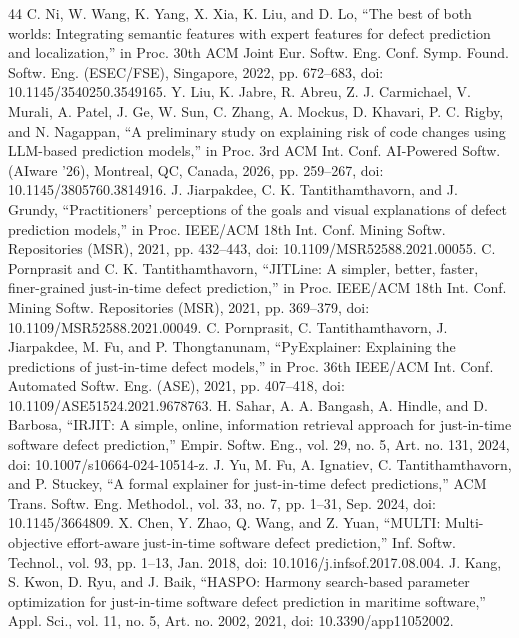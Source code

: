 \begin{thebibliography}{44}
 C. Ni, W. Wang, K. Yang, X. Xia, K. Liu, and D. Lo, ``The best of both worlds: Integrating semantic features with expert features for defect prediction and localization,'' in Proc. 30th ACM Joint Eur. Softw. Eng. Conf. Symp. Found. Softw. Eng. (ESEC/FSE), Singapore, 2022, pp. 672--683, doi: \mbox{10.1145/3540250.3549165}.
 Y. Liu, K. Jabre, R. Abreu, Z. J. Carmichael, V. Murali, A. Patel, J. Ge, W. Sun, C. Zhang, A. Mockus, D. Khavari, P. C. Rigby, and N. Nagappan, ``A preliminary study on explaining risk of code changes using LLM-based prediction models,'' in Proc. 3rd ACM Int. Conf. AI-Powered Softw. (AIware '26), Montreal, QC, Canada, 2026, pp. 259--267, doi: \mbox{10.1145/3805760.3814916}.
 J. Jiarpakdee, C. K. Tantithamthavorn, and J. Grundy, ``Practitioners' perceptions of the goals and visual explanations of defect prediction models,'' in Proc. IEEE/ACM 18th Int. Conf. Mining Softw. Repositories (MSR), 2021, pp. 432--443, doi: \mbox{10.1109/MSR52588.2021.00055}.
 C. Pornprasit and C. K. Tantithamthavorn, ``JITLine: A simpler, better, faster, finer-grained just-in-time defect prediction,'' in Proc. IEEE/ACM 18th Int. Conf. Mining Softw. Repositories (MSR), 2021, pp. 369--379, doi: \mbox{10.1109/MSR52588.2021.00049}.
 C. Pornprasit, C. Tantithamthavorn, J. Jiarpakdee, M. Fu, and P. Thongtanunam, ``PyExplainer: Explaining the predictions of just-in-time defect models,'' in Proc. 36th IEEE/ACM Int. Conf. Automated Softw. Eng. (ASE), 2021, pp. 407--418, doi: \mbox{10.1109/ASE51524.2021.9678763}.
 H. Sahar, A. A. Bangash, A. Hindle, and D. Barbosa, ``IRJIT: A simple, online, information retrieval approach for just-in-time software defect prediction,'' Empir. Softw. Eng., vol. 29, no. 5, Art. no. 131, 2024, doi: \mbox{10.1007/s10664-024-10514-z}.
 J. Yu, M. Fu, A. Ignatiev, C. Tantithamthavorn, and P. Stuckey, ``A formal explainer for just-in-time defect predictions,'' ACM Trans. Softw. Eng. Methodol., vol. 33, no. 7, pp. 1--31, Sep. 2024, doi: \mbox{10.1145/3664809}.
 X. Chen, Y. Zhao, Q. Wang, and Z. Yuan, ``MULTI: Multi-objective effort-aware just-in-time software defect prediction,'' Inf. Softw. Technol., vol. 93, pp. 1--13, Jan. 2018, doi: \mbox{10.1016/j.infsof.2017.08.004}.
 J. Kang, S. Kwon, D. Ryu, and J. Baik, ``HASPO: Harmony search-based parameter optimization for just-in-time software defect prediction in maritime software,'' Appl. Sci., vol. 11, no. 5, Art. no. 2002, 2021, doi: \mbox{10.3390/app11052002}.

\end{thebibliography}
